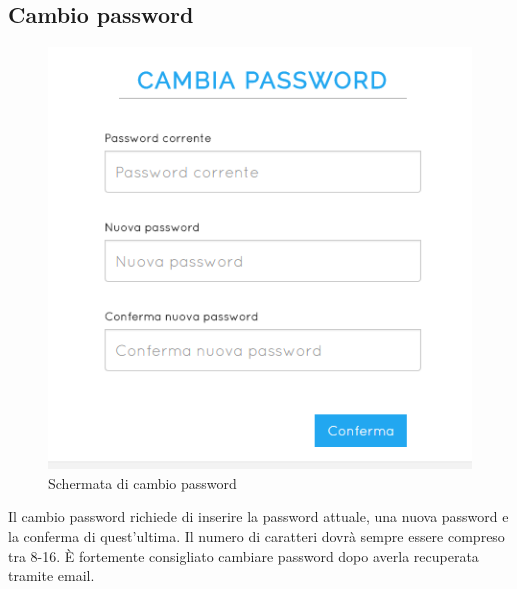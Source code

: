 \documentclass[a4paper, titlepage]{article}
\begin{document}
	\subsection{Cambio password}
	
	\begin{figure}[!h]
		\centering
		\includegraphics[scale=0.33]{Img/screen_CambioPassword.png}
		\caption{Schermata di cambio password}
	\end{figure}
	Il cambio password richiede di inserire la password attuale, una nuova password e la conferma di quest'ultima. Il numero di caratteri dovrà sempre essere compreso tra 8-16. È fortemente consigliato cambiare password dopo averla recuperata tramite email.
	
	\newpage
\end{document}
